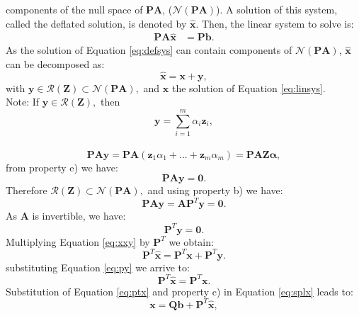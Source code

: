 \documentclass[12pt]{article}
\begin{document}
components of the null space of $\mathbf{P}\mathbf{A}$, ($\mathcal{N}(\mathbf{P}\mathbf{A})$). A solution of this system, called the deflated
solution, is denoted by $\mathbf{\hat{x}}$. Then, the linear system to solve is:\\
\begin{align}\label{eq:defsys}
\mathbf{P}\mathbf{A}\hat{\mathbf{x}}&=\mathbf{P}\mathbf{b}.
\end{align}
As the solution of Equation \eqref{eq:defsys} can contain components of 
$\mathcal{N}(\mathbf{P}\mathbf{A})$,
$\mathbf{\hat{x}}$ can be decomposed as:
\begin{equation}\label{eq:xxy}
\mathbf{\hat{x}}=\mathbf{x}+ \mathbf{y},
\end{equation}
with $\mathbf{y} \in \mathcal{R}(\mathbf{Z})\subset \mathcal{N}(\mathbf{P}\mathbf{A}),$ 
and $\mathbf{x}$ the solution of Equation \eqref{eq:linsys}.\\
Note: If $\mathbf{y} \in \mathcal{R}(\mathbf{Z}),$ then $$\mathbf{y}=\sum^{m}_{i=1}\alpha_i \mathbf{z}_i,$$\\
 \begin{equation*}\label{eq:paz}
 \mathbf{P}\mathbf{A}\mathbf{y} =\mathbf{P}\mathbf{A}(\mathbf{z}_1\alpha_1 +...+ \mathbf{z}_m\alpha_m)=\mathbf{P}\mathbf{A}\mathbf{Z}\mathbf{\alpha},\end{equation*}
 from property e) we have:
 \begin{equation*}\label{eq:pay}
 \mathbf{P}\mathbf{A}\mathbf{y}=\mathbf{0}.
 \end{equation*}
Therefore $\mathcal{R}(\mathbf{Z})\subset \mathcal{N}(\mathbf{P}\mathbf{A}),$ and using property b) we have:
 \begin{equation*}
 \mathbf{P}\mathbf{A}\mathbf{y}=\mathbf{A}\mathbf{P}^T\mathbf{y}=\mathbf{0}.
 \end{equation*}
 As $\mathbf{A}$ is invertible, we have:
  \begin{equation}\label{eq:py}
\mathbf{P}^T\mathbf{y}=\mathbf{0}.
 \end{equation}
 Multiplying Equation \eqref{eq:xxy} by $\mathbf{P}^T$ we obtain:
$$\mathbf{P}^T\mathbf{\hat{x}}=\mathbf{P}^T\mathbf{x}+\mathbf{P}^T\mathbf{y}.$$
substituting Equation \eqref{eq:py} we arrive to:
  \begin{equation}\label{eq:ptx}
\mathbf{P}^T\mathbf{\hat{x}}=\mathbf{P}^T\mathbf{x}.
 \end{equation}
Substitution of Equation \eqref{eq:ptx} and property c) in Equation \eqref{eq:splx} leads to:
\begin{equation}\label{eq:xfromxh1}
    \mathbf{x}=\mathbf{Q}\mathbf{b}+\mathbf{P}^T\mathbf{\hat{x}}, 
\end{equation}
\end{document}
